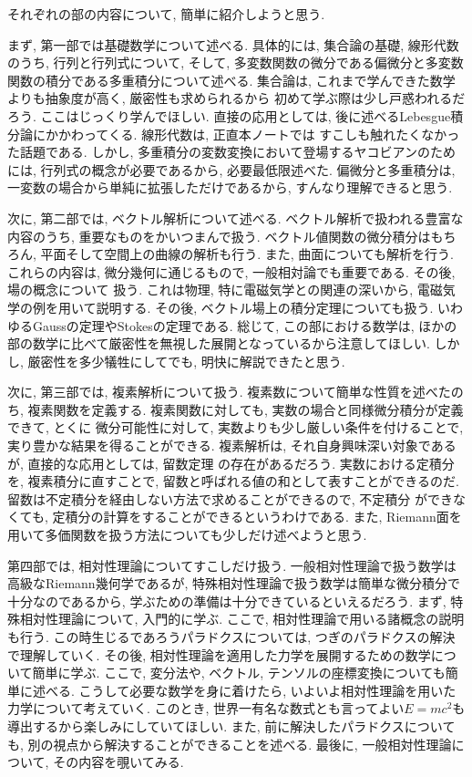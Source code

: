 \documentclass[a4j,dvipdfmx]{jsarticle}
\numberwithin{equation}{section}
\begin{document}
        それぞれの部の内容について, 簡単に紹介しようと思う. 
        
        まず, 第一部では基礎数学について述べる. 具体的には, 集合論の基礎, 線形代数のうち, 行列と行列式について,
        そして, 多変数関数の微分である偏微分と多変数関数の積分である多重積分について述べる. 集合論は, これまで学んできた数学よりも抽象度が高く, 厳密性も求められるから
        初めて学ぶ際は少し戸惑われるだろう. ここはじっくり学んでほしい. 直接の応用としては, 後に述べるLebesgue積分論にかかわってくる. 線形代数は, 正直本ノートでは
        すこしも触れたくなかった話題である. しかし, 多重積分の変数変換において登場するヤコビアンのためには, 行列式の概念が必要であるから, 必要最低限述べた.
        偏微分と多重積分は, 一変数の場合から単純に拡張しただけであるから, すんなり理解できると思う.

        次に, 第二部では, ベクトル解析について述べる. ベクトル解析で扱われる豊富な内容のうち, 重要なものをかいつまんで扱う. ベクトル値関数の微分積分はもちろん, 
        平面そして空間上の曲線の解析も行う. また, 曲面についても解析を行う. これらの内容は,  微分幾何に通じるもので, 一般相対論でも重要である. その後, 場の概念について
        扱う. これは物理, 特に電磁気学との関連の深いから, 電磁気学の例を用いて説明する. その後, ベクトル場上の積分定理についても扱う. いわゆるGaussの定理やStokesの定理である.
        総じて, この部における数学は, ほかの部の数学に比べて厳密性を無視した展開となっているから注意してほしい. しかし, 厳密性を多少犠牲にしてでも, 明快に解説できたと思う.

        次に, 第三部では, 複素解析について扱う. 複素数について簡単な性質を述べたのち, 複素関数を定義する. 複素関数に対しても, 実数の場合と同様微分積分が定義できて, とくに
        微分可能性に対して, 実数よりも少し厳しい条件を付けることで, 実り豊かな結果を得ることができる. 複素解析は, それ自身興味深い対象であるが, 直接的な応用としては, 留数定理
        の存在があるだろう. 実数における定積分を, 複素積分に直すことで, 留数と呼ばれる値の和として表すことができるのだ. 留数は不定積分を経由しない方法で求めることができるので, 不定積分
        ができなくても, 定積分の計算をすることができるというわけである. また, Riemann面を用いて多価関数を扱う方法についても少しだけ述べようと思う.

        第四部では, 相対性理論についてすこしだけ扱う. 一般相対性理論で扱う数学は高級なRiemann幾何学であるが, 特殊相対性理論で扱う数学は簡単な微分積分で十分なのであるから, 学ぶための準備は十分できているといえるだろう.
        まず, 特殊相対性理論について, 入門的に学ぶ. ここで, 相対性理論で用いる諸概念の説明も行う. この時生じるであろうパラドクスについては, つぎのパラドクスの解決で理解していく.
        その後, 相対性理論を適用した力学を展開するための数学について簡単に学ぶ. ここで, 変分法や, ベクトル, テンソルの座標変換についても簡単に述べる. こうして必要な数学を身に着けたら, 
        いよいよ相対性理論を用いた力学について考えていく. このとき, 世界一有名な数式とも言ってよい$E=mc^2$も導出するから楽しみにしていてほしい. また, 前に解決したパラドクスについても, 別の視点から解決することができることを述べる.
        最後に, 一般相対性理論について, その内容を覗いてみる.
\end{document}
